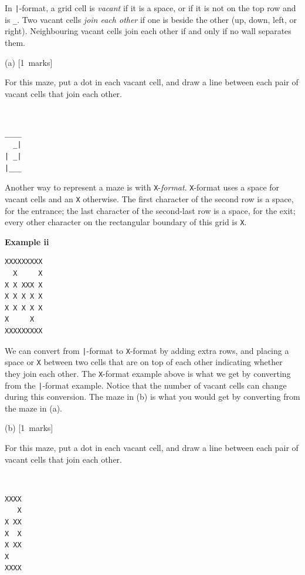 \documentclass[12pt]{article}
\newcommand{\mymarks}[1]{\mbox{\small [#1 marks]}}
\begin{document}
In \texttt{|}-format,
a grid cell is {\em vacant} if it is a space, or
if it is not on the top row and is \verb&_&. Two vacant cells 
{\em join each other}
if one is beside the other (up, down, left, or right).
Neighbouring vacant cells join each other if 
and only if no wall separates them.
\vfill

\noindent
(a) \mymarks{1} ~ ~
\begin{minipage}[c]{11cm}
For this maze, put a dot in each vacant cell,
and draw a line between each pair of vacant cells that 
join each other.
\end{minipage} ~ ~
\begin{minipage}[c]{3cm}
{\large\begin{verbatim}
____
  _|
| _|
|___

\end{verbatim}}
\end{minipage}

Another way to represent a maze is with \verb&X&-{\em format}.
\verb&X&-format uses a space for vacant cells and an \verb&X& otherwise.
The first character of the second row is a space,
for the entrance; 
the last character of the second-last row is a space, for the exit;
every other character on the rectangular boundary 
of this grid is \verb&X&.
\vfill

\noindent
\begin{minipage}[c]{3cm}
{\bf Example ii}
\end{minipage}
\begin{minipage}[c]{10cm}
{\small\begin{verbatim}
XXXXXXXXX
  X     X
X X XXX X
X X X X X
X X X X X
X     X  
XXXXXXXXX

\end{verbatim}}
\end{minipage}

We can convert from \verb&|&-format to \verb&X&-format 
by adding extra rows, and placing a space or \verb&X&
between two cells that are on top of each other indicating 
whether they join each other.
The \verb&X&-format example above is what we get by converting from the \verb&|&-format example.
Notice that the number of vacant cells can change during this conversion.
The maze in (b) is what you would get by converting from
the maze in (a).
\vfill

\noindent
(b) \mymarks{1} ~ ~
\begin{minipage}[c]{11cm}
For this maze, put a dot in each vacant cell,
and draw a line between each pair of vacant cells that join
each other.
\end{minipage} ~ ~
\begin{minipage}[c]{3cm}
{\small\begin{verbatim}
XXXX
   X
X XX
X  X
X XX
X  
XXXX
\end{verbatim}}
\end{minipage}
\end{document}
